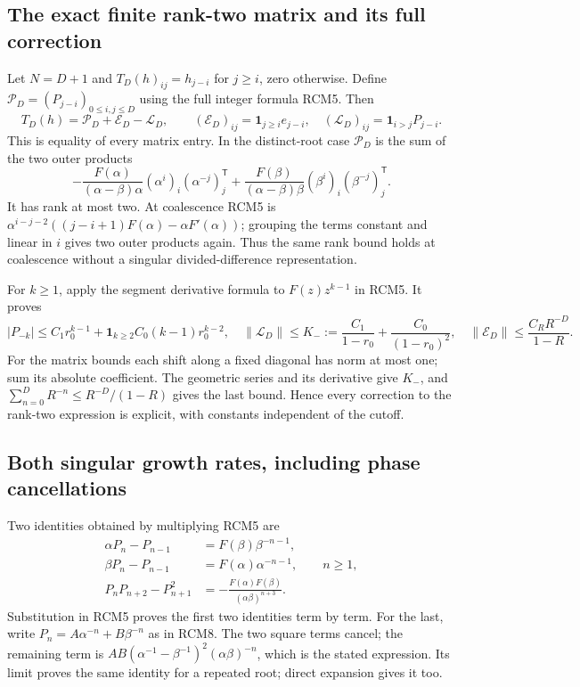 \subsection{The exact finite rank-two matrix and its full correction}
Let $N=D+1$ and $T_D(h)_{ij}=h_{j-i}$ for $j\ge i$, zero
otherwise.  Define $\mathcal P_D=(P_{j-i})_{0\le i,j\le D}$
using the full integer formula RCM5.  Then
\[
 T_D(h)=\mathcal P_D+\mathcal E_D-\mathcal L_D,
 \qquad
 (\mathcal E_D)_{ij}=\boldsymbol1_{j\ge i}e_{j-i},\quad
 (\mathcal L_D)_{ij}=\boldsymbol1_{i>j}P_{j-i}.
 \tag{RCM7}
\]
This is equality of every matrix entry.  In the distinct-root
case $\mathcal P_D$ is the sum of the two outer products
\[
 -\frac{F(\alpha)}{(\alpha-\beta)\alpha}
   (\alpha^i)_i(\alpha^{-j})_j^{\mathsf T}
 +\frac{F(\beta)}{(\alpha-\beta)\beta}
   (\beta^i)_i(\beta^{-j})_j^{\mathsf T}.
 \tag{RCM8}
\]
It has rank at most two.  At coalescence RCM5 is
$\alpha^{i-j-2}((j-i+1)F(\alpha)-\alpha F'(\alpha))$;
grouping the terms constant and linear in $i$ gives two outer
products again.  Thus the same rank bound holds at coalescence
without a singular divided-difference representation.

For $k\ge1$, apply the segment derivative formula to
$F(z)z^{k-1}$ in RCM5.  It proves
\[
 |P_{-k}|\le C_1r_0^{k-1}+
   \boldsymbol1_{k\ge2}C_0(k-1)r_0^{k-2},\quad
 \|\mathcal L_D\|\le
 K_-:=\frac{C_1}{1-r_0}+\frac{C_0}{(1-r_0)^2},\quad
 \|\mathcal E_D\|\le\frac{C_R R^{-D}}{1-R}.
 \tag{RCM9}
\]
For the matrix bounds each shift along a fixed diagonal has norm
at most one; sum its absolute coefficient.  The geometric series
and its derivative give $K_-$, and
$\sum_{n=0}^D R^{-n}\le R^{-D}/(1-R)$ gives the last bound.
Hence every correction to the rank-two expression is explicit,
with constants independent of the cutoff.

\subsection{Both singular growth rates, including phase cancellations}
Two identities obtained by multiplying RCM5 are
\[
 \begin{aligned}
 \alpha P_n-P_{n-1}&=F(\beta)\beta^{-n-1},\\
 \beta P_n-P_{n-1}&=F(\alpha)\alpha^{-n-1},\qquad n\ge1,\\
 P_nP_{n+2}-P_{n+1}^2
     &=-\frac{F(\alpha)F(\beta)}{(\alpha\beta)^{n+3}}.
 \end{aligned}\tag{RCM10}
\]
Substitution in RCM5 proves the first two identities term by term.
For the last, write $P_n=A\alpha^{-n}+B\beta^{-n}$ as in
RCM8.  The two square terms cancel; the remaining term is
$AB(\alpha^{-1}-\beta^{-1})^2(\alpha\beta)^{-n}$,
which is the stated expression.  Its limit proves the same
identity for a repeated root; direct expansion gives it too.

